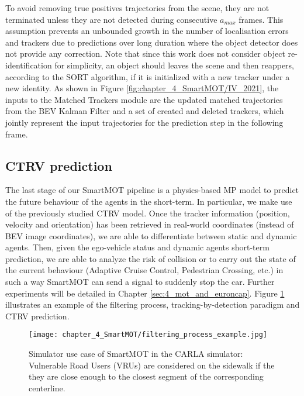 To avoid removing true positives trajectories from the scene, they are not terminated unless they are not detected during consecutive $a_{max}$ frames. This assumption prevents an unbounded growth in the number of localisation errors and trackers due to predictions over long duration where the object detector does not provide any correction. Note that since this work does not consider object re-identification for simplicity, an object should leaves the scene and then reappers, according to the SORT algorithm, if it is initialized with a new tracker under a new identity. As shown in Figure \ref{fig:chapter_4_SmartMOT/IV_2021}, the inputs to the Matched Trackers module are the updated matched trajectories from the BEV Kalman Filter and a set of created and deleted trackers, which jointly represent the input trajectories for the prediction step in the following frame.

\subsection{CTRV prediction}
\label{subsec:4_smartmot_ctrv_prediction}

The last stage of our SmartMOT pipeline is a physics-based \ac{MP} model to predict the future behaviour of the agents in the short-term. In particular, we make use of the previously studied \ac{CTRV} model. Once the tracker information (position, velocity and orientation) has been retrieved in real-world coordinates (instead of \ac{BEV} image coordinates), we are able to differentiate between static and dynamic agents. Then, given the ego-vehicle status and dynamic agents short-term prediction, we are able to analyze the risk of collision or to carry out the state of the current behaviour (Adaptive Cruise Control, Pedestrian Crossing, etc.) in such a way SmartMOT can send a signal to suddenly stop the car. Further experiments will be detailed in Chapter \ref{sec:4_mot_and_euroncap}. Figure \ref{fig:chapter_4_SmartMOT/filtering_process_example} illustrates an example of the filtering process, tracking-by-detection paradigm and \ac{CTRV} prediction.

\begin{figure}[] 
	\centering
	\texttt{[image: chapter\_4\_SmartMOT/filtering\_process\_example.jpg]}
	\caption[Simulator use case of SmartMOT in the CARLA simulator]{Simulator use case of SmartMOT in the CARLA simulator: Vulnerable Road Users (VRUs) are considered on the sidewalk if the they are close enough to the closest segment of the corresponding centerline.}
	\label{fig:chapter_4_SmartMOT/filtering_process_example}
\end{figure} 

